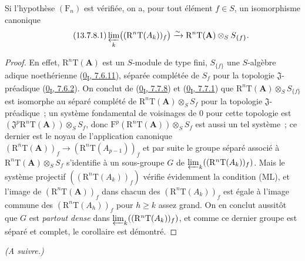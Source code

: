\begin{corollary}[13.7.8]
\label{0.13.7.8-fr}
Si l'hypothèse $(\mathrm F_n)$ est vérifiée, on a, pour tout élément $f\in S$,
un isomorphisme canonique
\begin{equation}
\label{0.13.7.8.1-fr}
\tag{13.7.8.1}
\varprojlim_k\bigl((\mathrm R^n\mathrm T(A_k))_f\bigr)
\xrightarrow{\sim}\mathrm R^n\mathrm T(\mathbf A)\otimes_S S_{\{f\}}.
\end{equation}
\end{corollary}

\begin{proof}
En effet, $\mathrm R^n\mathrm T(\mathbf A)$ est un $S$-module de type fini,
$S_{\{f\}}$ une $S$-algèbre adique noethérienne
(\hyperref[0.7.6.11-fr]{0\textsubscript{I}, 7.6.11}), séparée complétée de
$S_f$ pour la topologie $\mathfrak J$-préadique
(\hyperref[0.7.6.2-fr]{0\textsubscript{I}, 7.6.2}). On conclut de
(\hyperref[0.7.7.8-fr]{0\textsubscript{I}, 7.7.8}) et
(\hyperref[0.7.7.1-fr]{0\textsubscript{I}, 7.7.1}) que
$\mathrm R^n\mathrm T(\mathbf A)\otimes_S S_{\{f\}}$ est isomorphe au séparé
complété de $\mathrm R^n\mathrm T(\mathbf A)\otimes_S S_f$ pour la topologie
$\mathfrak J$-préadique~; un système fondamental de voisinages de $0$ pour
cette topologie est
$(\mathfrak J^p\mathrm R^n\mathrm T(\mathbf A))\otimes_S S_f$, donc
$\mathrm F^p(\mathrm R^n\mathrm T(\mathbf A))\otimes_S S_f$ est aussi un tel
système~; ce dernier est le noyau de l'application canonique
$(\mathrm R^n\mathrm T(\mathbf A))_f\to
(\mathrm R^n\mathrm T(A_{p-1}))_f$ et par suite le groupe séparé associé à
$\mathrm R^n\mathrm T(\mathbf A)\otimes_S S_f$ s'identifie à un sous-groupe
$G$ de $\varprojlim_k((\mathrm R^n\mathrm T(A_k))_f)$. Mais le système
projectif $((\mathrm R^n\mathrm T(A_k))_f)$ vérifie évidemment la condition
(ML), et l'image de $(\mathrm R^n\mathrm T(\mathbf A))_f$ dans chacun des
$(\mathrm R^n\mathrm T(A_k))_f$ est égale à l'image commune des
$(\mathrm R^n\mathrm T(A_h))_f$ pour $h\geq k$ assez grand. On en conclut
aussitôt que $G$ est \emph{partout dense} dans
$\varprojlim_k((\mathrm R^n\mathrm T(A_k))_f)$, et comme ce dernier groupe est
séparé et complet, le corollaire est démontré.
\end{proof}

\begin{flushright}
\textit{(A suivre.)}
\end{flushright}

\clearpage
\thispagestyle{empty}
\null
\clearpage
\thispagestyle{plain}
\label{chapter:III-fr}

